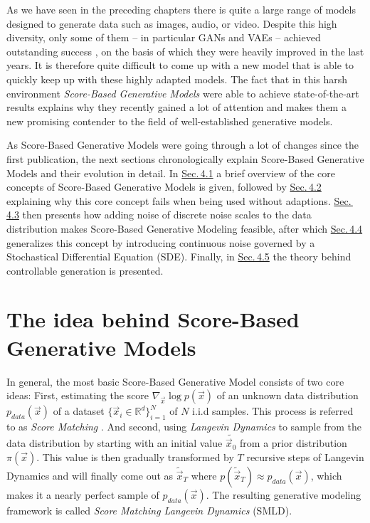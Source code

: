 As we have seen in the preceding chapters there is quite a large range of models designed to generate data such as images, audio, or video. Despite this high diversity, only some of them – in particular GANs and VAEs – achieved outstanding success \cite{biggan, vqvae2}, on the basis of which they were heavily improved in the last years. It is therefore quite difficult to come up with a new model that is able to quickly keep up with these highly adapted models. The fact that in this harsh environment \textit{Score-Based Generative Models} \cite{score_1, score_3, score_2} were able to achieve state-of-the-art results explains why they recently gained a lot of attention and makes them a new promising contender to the field of well-established generative models.

As Score-Based Generative Models were going through a lot of changes since the first publication, the next sections chronologically explain Score-Based Generative Models and their evolution in detail. In \hyperref[sec:4.1]{Sec.\,4.1} a brief overview of the core concepts of Score-Based Generative Models is given, followed by \hyperref[sec:4.2]{Sec.\,4.2} explaining why this core concept fails when being used without adaptions. \hyperref[sec:4.3]{Sec.\,4.3} then presents how adding noise of discrete noise scales to the data distribution makes Score-Based Generative Modeling feasible, after which \hyperref[sec:4.4]{Sec.\,4.4} generalizes this concept by introducing continuous noise governed by a Stochastical Differential Equation (SDE). Finally, in \hyperref[sec:4.5]{Sec.\,4.5} the theory behind controllable generation is presented.

\section{The idea behind Score-Based Generative Models} \label{sec:4.1}
In general, the most basic Score-Based Generative Model consists of two core ideas: First, estimating the score $\nabla_{\vec{x}}\log p(\vec{x})$ of an unknown data distribution $p_{data}(\vec{x})$ of a dataset $\{\vec{x}_i\in \mathbb{R}^d\}_{i=1}^N$ of $N$ i.i.d samples. This process is referred to as \textit{Score Matching} \cite{score_matching_original}. And second, using \textit{Langevin Dynamics} \cite{langevin1, langevin2} to sample from the data distribution by starting with an initial value $\tilde{\vec{x}_0}$ from a prior distribution $\pi(\vec{x})$. This value is then gradually transformed by $T$ recursive steps of Langevin Dynamics and will finally come out as $\tilde{\vec{x}}_T$ where $p(\tilde{\vec{x}}_T)\approx p_{data}(\vec{x})$, which makes it a nearly perfect sample of $p_{data}(\vec{x})$. The resulting generative modeling framework is called \textit{Score Matching Langevin Dynamics} (SMLD).
%
